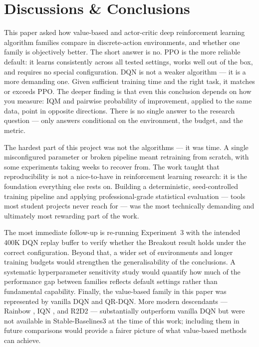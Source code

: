 
\chapter{Discussions \& Conclusions}
\label{chap:discuss_and_conclus}







{\color{red}
This paper asked how value-based and actor-critic deep reinforcement learning algorithm families compare in discrete-action environments, and whether one family is objectively better. The short answer is no. PPO is the more reliable default: it learns consistently across all tested settings, works well out of the box, and requires no special configuration. DQN is not a weaker algorithm --- it is a more demanding one. Given sufficient training time and the right task, it matches or exceeds PPO. The deeper finding is that even this conclusion depends on how you measure: IQM and pairwise probability of improvement, applied to the same data, point in opposite directions. There is no single answer to the research question --- only answers conditional on the environment, the budget, and the metric.

The hardest part of this project was not the algorithms --- it was time. A single misconfigured parameter or broken pipeline meant retraining from scratch, with some experiments taking weeks to recover from. The work taught that reproducibility is not a nice-to-have in reinforcement learning research: it is the foundation everything else rests on. Building a deterministic, seed-controlled training pipeline and applying professional-grade statistical evaluation --- tools most student projects never reach for --- was the most technically demanding and ultimately most rewarding part of the work.

The most immediate follow-up is re-running Experiment~3 with the intended 400K DQN replay buffer to verify whether the Breakout result holds under the correct configuration. Beyond that, a wider set of environments and longer training budgets would strengthen the generalisability of the conclusions. A systematic hyperparameter sensitivity study would quantify how much of the performance gap between families reflects default settings rather than fundamental capability. Finally, the value-based family in this paper was represented by vanilla DQN and QR-DQN. More modern descendants --- Rainbow \citep{hessel2018rainbow}, IQN \citep{dabney2018iqn}, and R2D2 \citep{kapturowski2019r2d2} --- substantially outperform vanilla DQN but were not available in Stable-Baselines3 at the time of this work; including them in future comparisons would provide a fairer picture of what value-based methods can achieve.
}

